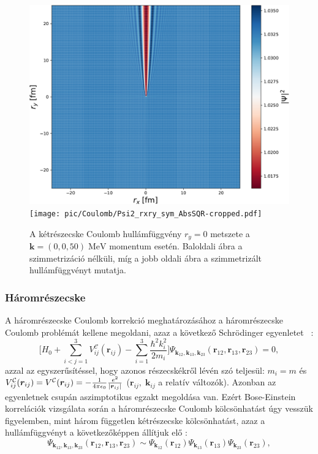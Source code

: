 \documentclass[11pt,a4paper]{article}
\numberwithin{equation}{subsection}
\numberwithin{figure}{section}
\begin{document}
\begin{figure}[H]
\centering
\includegraphics[scale=0.35]{pic/Coulomb/Psi2_rxry_nosym_AbsSQR-cropped.pdf}
\texttt{[image: pic/Coulomb/Psi2\_rxry\_sym\_AbsSQR-cropped.pdf]}
\caption{A kétrészecske Coulomb hullámfüggvény $r_y=0$ metszete a $\bm{k}=(0,0,50)\;\mathrm{MeV}$ momentum esetén. Baloldali ábra a szimmetrizáció nélküli, míg a jobb oldali ábra a szimmetrizált  hullámfüggvényt mutatja. }
\end{figure}

\subsubsection{Háromrészecske}

A háromrészecske Coulomb korrekció meghatározásához a háromrészecske Coulomb problémát kellene megoldani, azaz a következő Schrödinger egyenletet ~\cite{Alt:1998nr}:
\begin{equation}
\Bigg[H_0+\sum_{i<j=1}^3V^{\mathcal{C}}_{ij}(\bm{r}_{ij})
-\sum_{i=1}^3\frac{\hbar^2 k^2_i}{2m_i}
\Bigg]\Psi_{\bm{k}_{12}, \bm{k}_{13}, \bm{k}_{23}}(\bm{r}_{12},\bm{r}_{13},\bm{r}_{23}) = 0,
\end{equation}
azzal az egyszerűsítéssel, hogy azonos részecskékről lévén szó teljesül: $m_i=m$ és $V^\mathcal{C}_{ij}(\bm{r}_{ij})=V^\mathcal{C}(\bm{r}_{ij})=-\frac{1}{4\pi\epsilon_0}\frac{e^2}{\abs{\bm{r}_{ij}}}$ ($\bm{r}_{ij},\;\bm{k}_{ij}$ a relatív változók). Azonban az egyenletnek csupán aszimptotikus egzakt megoldása van. Ezért Bose-Einstein korrelációk vizsgálata során a háromrészecske Coulomb kölcsönhatást úgy vesszük figyelemben, mint három független kétrészecske kölcsönhatást, azaz a hullámfüggvényt a következőképpen állítjuk elő : ~\cite{Alt:1998nr}
\begin{equation}
\Psi_{\bm{k}_{12}, \bm{k}_{13}, \bm{k}_{23}}(\bm{r}_{12},\bm{r}_{13},\bm{r}_{23})  \sim
\Psi_{\bm{k}_{12}}(\bm{r}_{12})\Psi_{\bm{k}_{13}}(\bm{r}_{13})\Psi_{\bm{k}_{23}}(\bm{r}_{23}),
\end{equation}
\end{document}
